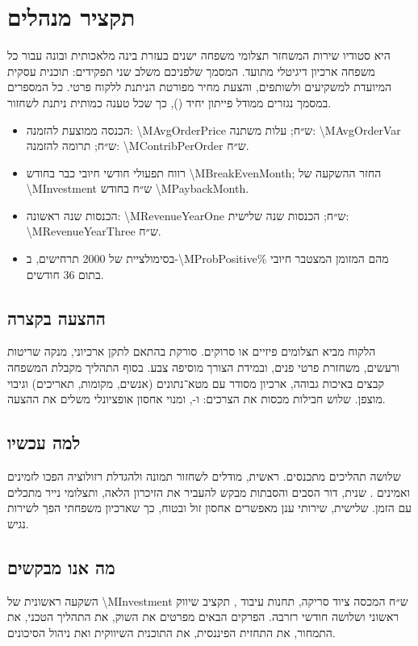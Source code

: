 \section{תקציר מנהלים }

 היא סטודיו שירות המשחזר תצלומי משפחה ישנים בעזרת בינה מלאכותית ובונה עבור כל משפחה ארכיון דיגיטלי מתועד. המסמך שלפניכם משלב שני תפקידים: תוכנית עסקית המיועדת למשקיעים ולשותפים, והצעת מחיר מפורטת הניתנת ללקוח פרטי. כל המספרים במסמך נגזרים ממודל פייתון יחיד (), כך שכל טענה כמותית ניתנת לשחזור.

\begin{keybox}[title={\en{Memoria} במספרים}]
\begin{itemize}[leftmargin=*,itemsep=2pt]
  \item הכנסה ממוצעת להזמנה: \num{\MAvgOrderPrice} ש״ח; עלות משתנה: \num{\MAvgOrderVar} ש״ח; תרומה להזמנה: \num{\MContribPerOrder} ש״ח.
  \item רווח תפעולי חודשי חיובי כבר בחודש \num{\MBreakEvenMonth}; החזר ההשקעה של \num{\MInvestment} ש״ח בחודש \num{\MPaybackMonth}.
  \item הכנסות שנה ראשונה: \num{\MRevenueYearOne} ש״ח; הכנסות שנה שלישית: \num{\MRevenueYearThree} ש״ח.
  \item בסימולציית  של \num{2000} תרחישים, ב-\num{\MProbPositive}\% מהם המזומן המצטבר חיובי בתום \num{36} חודשים.
\end{itemize}
\end{keybox}

\subsection{ההצעה בקצרה}
הלקוח מביא תצלומים פיזיים או סרוקים.  סורקת בהתאם לתקן ארכיוני, מנקה שריטות ורעשים, משחזרת פרטי פנים, ובמידת הצורך מוסיפה צבע. בסוף התהליך מקבלת המשפחה קבצים באיכות גבוהה, ארכיון מסודר עם מטא־נתונים (אנשים, מקומות, תאריכים) וגיבוי מוצפן. שלוש חבילות מכסות את הצרכים:  ו-, ומנוי אחסון אופציונלי משלים את ההצעה.

\subsection{למה עכשיו}
שלושה תהליכים מתכנסים. ראשית, מודלים לשחזור תמונה ולהגדלת רזולוציה הפכו לזמינים ואמינים \cite{wang2021realesrgan,wang2021gfpgan}. שנית, דור הסבים והסבתות מבקש להעביר את הזיכרון הלאה, ותצלומי נייר מתכלים עם הזמן. שלישית, שירותי ענן מאפשרים אחסון זול ובטוח, כך שארכיון משפחתי הפך לשירות נגיש.

\subsection{מה אנו מבקשים}
השקעה ראשונית של \num{\MInvestment} ש״ח המכסה ציוד סריקה, תחנות עיבוד , תקציב שיווק ראשוני ושלושה חודשי רזרבה. הפרקים הבאים מפרטים את השוק, את התהליך הטכני, את התמחור, את התחזית הפיננסית, את התוכנית השיווקית ואת ניהול הסיכונים.
